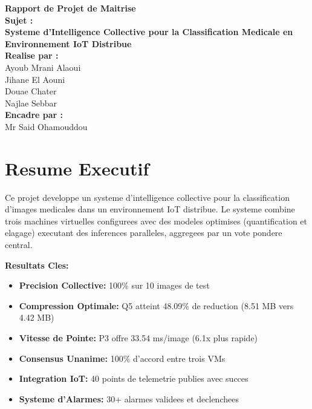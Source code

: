\documentclass[12pt,a4paper]{report}
\begin{document}
\begin{titlepage}
\centering
\vspace*{3cm}

{\LARGE \textbf{Rapport de Projet de Maitrise}}\\[2cm]

{\large \textbf{Sujet :}}\\[0.5cm]

{\Huge \textbf{Systeme d'Intelligence Collective pour la Classification Medicale en Environnement IoT Distribue}}\\[3cm]

{\large \textbf{Realise par :}}\\[0.3cm]
{\large Ayoub Mrani Alaoui}\\
{\large Jihane El Aouni}\\
{\large Douae Chater}\\
{\large Najlae Sebbar}\\[2cm]

{\large \textbf{Encadre par :}}\\[0.3cm]
{\large Mr Said Ohamouddou}\\[2cm]

\vfill
\end{titlepage}

\newpage

\chapter*{Resume Executif}

Ce projet developpe un systeme d'intelligence collective pour la classification d'images medicales dans un environnement IoT distribue. Le systeme combine trois machines virtuelles configurees avec des modeles optimises (quantification et elagage) executant des inferences paralleles, aggregees par un vote pondere central.

\vspace{0.5cm}
\textbf{Resultats Cles:}
\begin{itemize}
    \item \textbf{Precision Collective:} 100\% sur 10 images de test
    \item \textbf{Compression Optimale:} Q5 atteint 48.09\% de reduction (8.51 MB vers 4.42 MB)
    \item \textbf{Vitesse de Pointe:} P3 offre 33.54 ms/image (6.1x plus rapide)
    \item \textbf{Consensus Unanime:} 100\% d'accord entre trois VMs
    \item \textbf{Integration IoT:} 40 points de telemetrie publies avec succes
    \item \textbf{Systeme d'Alarmes:} 30+ alarmes validees et declenchees
\end{itemize}
\end{document}
